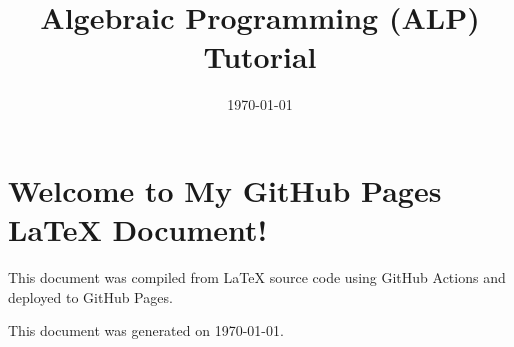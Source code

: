 \documentclass{article}
\title{Algebraic Programming (ALP) Tutorial}
\author{}
\date{\today} %
\begin{document}
\maketitle

\section*{Welcome to My GitHub Pages LaTeX Document!}

This document was compiled from \LaTeX{} source code using GitHub Actions and deployed to GitHub Pages.






\vfill %
\centering
\small This document was generated on \today.
\end{document}
